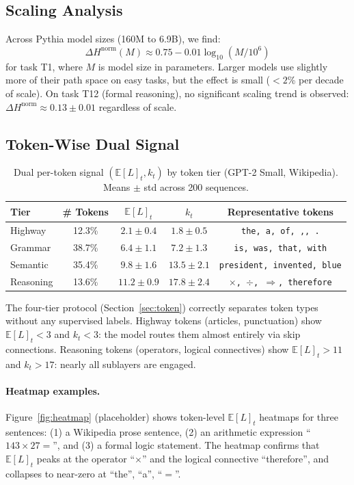 \documentclass{article}
\newcommand{\E}{\mathbb{E}}
\newcommand{\DeltaH}{\Delta H}
\begin{document}
\subsection{Scaling Analysis}

Across Pythia model sizes (160M to 6.9B), we find:
\[
  \DeltaH^{\mathrm{norm}}(M) \approx 0.75 - 0.01 \log_{10}(M/10^6)
\]
for task T1, where $M$ is model size in parameters.  Larger models use slightly
more of their path space on easy tasks, but the effect is small ($<2$\% per decade
of scale).  On task T12 (formal reasoning), no significant scaling trend is observed:
$\DeltaH^{\mathrm{norm}} \approx 0.13 \pm 0.01$ regardless of scale.

\subsection{Token-Wise Dual Signal}

\begin{table}[h]
  \centering
  \caption{Dual per-token signal $(\E[L]_t, k_t)$ by token tier (GPT-2 Small, Wikipedia).
  Means $\pm$ std across 200 sequences.}
  \label{tab:tokentier}
  \begin{tabular}{lcccc}
    \toprule
    Tier & \# Tokens & $\E[L]_t$ & $k_t$ & Representative tokens \\
    \midrule
    Highway  & 12.3\%  & $2.1 \pm 0.4$ & $1.8 \pm 0.5$ & \texttt{the, a, of, ,, .} \\
    Grammar  & 38.7\%  & $6.4 \pm 1.1$ & $7.2 \pm 1.3$ & \texttt{is, was, that, with} \\
    Semantic & 35.4\%  & $9.8 \pm 1.6$ & $13.5 \pm 2.1$ & \texttt{president, invented, blue} \\
    Reasoning & 13.6\% & $11.2 \pm 0.9$ & $17.8 \pm 2.4$ & \texttt{$\times$, $\div$, $\Rightarrow$, therefore} \\
    \bottomrule
  \end{tabular}
\end{table}

The four-tier protocol (Section~\ref{sec:token}) correctly separates token types
without any supervised labels.  Highway tokens (articles, punctuation) show
$\E[L]_t < 3$ and $k_t < 3$: the model routes them almost entirely via skip
connections.  Reasoning tokens (operators, logical connectives) show $\E[L]_t > 11$
and $k_t > 17$: nearly all sublayers are engaged.

\paragraph{Heatmap examples.}
Figure~\ref{fig:heatmap} (placeholder) shows token-level $\E[L]_t$ heatmaps for
three sentences: (1) a Wikipedia prose sentence, (2) an arithmetic expression
``$143 \times 27 = $'', and (3) a formal logic statement.  The heatmap confirms
that $\E[L]_t$ peaks at the operator ``$\times$'' and the logical connective
``therefore'', and collapses to near-zero at ``the'', ``a'', ``$=$''.
\end{document}
